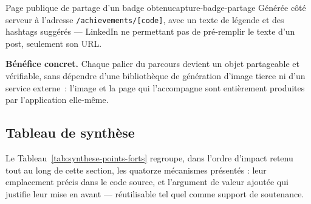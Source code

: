   {Page publique de partage d'un badge obtenu}{capture-badge-partage}
  {Générée côté serveur à l'adresse \texttt{/achievements/[code]}, avec un
   texte de légende et des hashtags suggérés --- LinkedIn ne permettant pas
   de pré-remplir le texte d'un post, seulement son URL.}

\textbf{Bénéfice concret.} Chaque palier du parcours devient un objet
partageable et vérifiable, sans dépendre d'une bibliothèque de génération
d'image tierce ni d'un service externe~: l'image et la page qui
l'accompagne sont entièrement produites par l'application elle-même.

\subsection{Tableau de synthèse}

Le Tableau~\ref{tab:synthese-points-forts} regroupe, dans l'ordre d'impact
retenu tout au long de cette section, les quatorze mécanismes présentés :
leur emplacement précis dans le code source, et l'argument de valeur
ajoutée qui justifie leur mise en avant --- réutilisable tel quel comme
support de soutenance.


